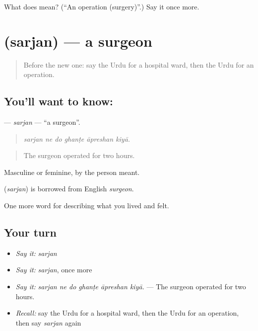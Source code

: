 \begin{tcolorbox}[breakable,colback=teal!4,colframe=teal!35!black,title={Before you move on}]
What does  mean? (\textquotedblleft{}An operation (surgery)\textquotedblright{}.) Say it once more.
\end{tcolorbox}
\section[\texorpdfstring{\ur{سرجن} (sarjan)}{سرجن (sarjan)}]{ (sarjan) — a surgeon}

\label{lesson:UR-C479-sarjan}



\begin{quote}
Before the new one: say the Urdu for a hospital ward, then the Urdu for an operation.
\end{quote}

\subsection*{You'll want to know: }
\textbf{} — \emph{sarjan} — \textquotedblleft{}a surgeon\textquotedblright{}.

\begin{quote}
     
\end{quote}

\begin{quote}
\emph{sarjan ne do ghanṭe āpreshan kiyā.}
\end{quote}

\begin{quote}
The surgeon operated for two hours.
\end{quote}

Masculine or feminine, by the person meant.

\begin{cousinweb}
\textbf{} (\emph{sarjan}) is borrowed from English \emph{surgeon}.
\end{cousinweb}

\begin{grammarlens}[title={What you've built}]
One more word for describing what you lived and felt.
\end{grammarlens}

\subsection*{Your turn}
\begin{itemize}
\raggedright
  \item \emph{Say it:} \emph{sarjan}
  \item \emph{Say it:} \emph{sarjan}, once more
  \item \emph{Say it:} \emph{sarjan ne do ghanṭe āpreshan kiyā.} — The surgeon operated for two hours.
  \item \emph{Recall:} say the Urdu for a hospital ward, then the Urdu for an operation, then say \emph{sarjan} again
\end{itemize}

